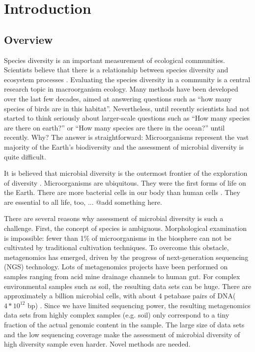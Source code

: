 \chapter{Introduction}

\section{Overview}
Species diversity is an important measurement of ecological communities. 
Scientists believe that there is a relationship between species diversity and 
ecosystem processes \cite{Loreau:2001aa}. Evaluating the species diversity in a
community is a central research topic in macroorganism ecology. Many methods 
have been developed over the last few decades, aimed at answering questions such as ``how many 
species of birds are in this habitat''. Nevertheless, until recently scientists 
had not started to think seriously about larger-scale questions such as ``How many 
species are there on earth?'' \cite{May:1988aa} or ``How many species are there 
in the ocean?'' \cite{Mora:2011aa} until recently. Why? The answer is 
straightforward: Microorganisms represent the vast majority of the Earth's 
biodiversity and the assessment of microbial diversity is quite difficult. 

It is believed that microbial diversity is the outermost frontier of 
the exploration of diversity \cite{magurran2011biological}. Microorganisms are 
ubiquitous. They were the first forms of life on the Earth. There are more 
bacterial cells in our body than human cells \cite{Savage:1977aa}.
They are essential to all life, too, ... @add something here.

There are several reasons why assessment 
of microbial diversity is such a challenge. First, the concept of species is 
ambiguous. Morphological examination is impossible: fewer than 1\% of 
microorganisms  in the biosphere can not be cultivated by traditional cultivation
techniques\cite{Curtis:2002aa}. To overcome this obstacle, 
metagenomics has emerged, driven by the progress of next-generation 
sequencing (NGS) technology. Lots of metagenomics projects have been performed on 
samples ranging from acid mine drainage channels to human gut. For complex 
environmental samples 
such as soil, the resulting data sets can be huge. There are approximately a 
billion microbial cells, with about 4 petabase pairs of DNA($4*{10}^{12}$ bp) \cite{Zarraonaindia:2013aa}. 
Since we have limited sequencing power, the 
resulting metagenomics data sets from highly complex samples (e.g. soil) only 
correspond to a tiny fraction of the actual genomic content in the sample. 
The large size of data sets and the low sequencing coverage make the assessment of 
microbial diversity of high diversity sample even harder. Novel methods are
needed. 


